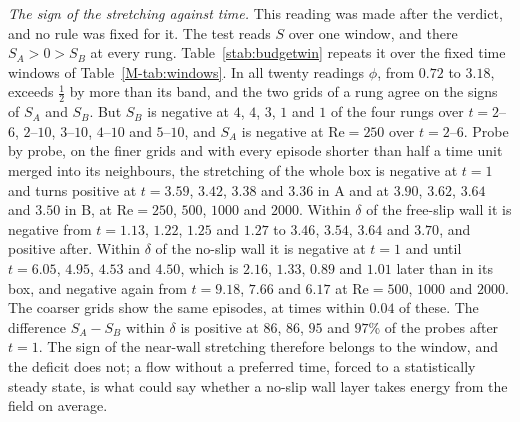\documentclass[aip,pop,reprint,amsmath,amssymb,superscriptaddress,floatfix]{revtex4-2}
\newcommand{\Rey}{\mathrm{Re}}
\begin{document}
\emph{The sign of the stretching against time.} This reading was made after the
verdict, and no rule was fixed for it. The test reads $S$ over one window, and there
$S_A>0>S_B$ at every rung. Table~\ref{stab:budgetwin} repeats it over the fixed time
windows of Table~\ref{M-tab:windows}. In all twenty readings $\phi$, from $0.72$ to
$3.18$, exceeds $\frac12$ by more than its band, and the two grids of a rung agree on
the signs of $S_A$ and $S_B$. But $S_B$ is negative at $4$, $4$, $3$, $1$ and $1$ of
the four rungs over $t=2$--$6$, $2$--$10$, $3$--$10$, $4$--$10$ and $5$--$10$, and
$S_A$ is negative at $\Rey=250$ over $t=2$--$6$. Probe by probe, on the finer grids
and with every episode shorter than half a time unit merged into its neighbours, the
stretching of the whole box is negative at $t=1$ and turns positive at $t=3.59$,
$3.42$, $3.38$ and $3.36$ in A and at $3.90$, $3.62$, $3.64$ and $3.50$ in B, at
$\Rey=250$, $500$, $1000$ and $2000$. Within $\delta$ of the free-slip wall it is
negative from $t=1.13$, $1.22$, $1.25$ and $1.27$ to $3.46$, $3.54$, $3.64$ and
$3.70$, and positive after. Within $\delta$ of the no-slip wall it is negative at
$t=1$ and until $t=6.05$, $4.95$, $4.53$ and $4.50$, which is $2.16$, $1.33$, $0.89$
and $1.01$ later than in its box, and negative again from $t=9.18$, $7.66$ and $6.17$
at $\Rey=500$, $1000$ and $2000$. The coarser grids show the same episodes, at times
within $0.04$ of these. The difference $S_A-S_B$ within $\delta$ is positive at $86$,
$86$, $95$ and $97$\% of the probes after $t=1$. The sign of the near-wall stretching
therefore belongs to the window, and the deficit does not; a flow without a preferred
time, forced to a statistically steady state, is what could say whether a no-slip
wall layer takes energy from the field on average.

\begin{table}
\caption{\label{stab:budget}The test of Sec.~\ref{M-sec:budget}, rung by rung, over
$t=2$--$10$ within $\delta$: $\phi$ on the finer and the coarser grid, its band, the
transport and storage shares of the Ohmic deficit (the three adding to one), the
near-wall stretching of each box as a share of its own near-wall Ohmic dissipation,
and the magnetic budget's closure within $\delta$ in A and B on the finer grid.}
\begin{ruledtabular}

\end{ruledtabular}
\end{table}

\begin{table}
\caption{\label{stab:budgetwin}The near-wall stretching of each box as a share of its
own near-wall Ohmic dissipation, and $\phi$, within $\delta$ and on the finer grid of
each rung, over the fixed time windows of Table~\ref{M-tab:windows}. The test was
registered for $t=2$--$10$; the other rows were read afterwards.}
\begin{ruledtabular}

\end{ruledtabular}
\end{table}
\end{document}
